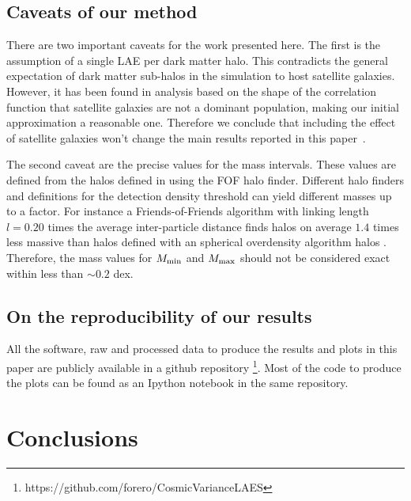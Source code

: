 \documentclass[usenatbib]{mn2e}
\newcommand{\documentname}{paper~}
\begin{document}
\subsection{Caveats of our method}

There are two important caveats for the work presented here. The first is the
assumption of a single LAE per dark matter halo. This contradicts the
general expectation of dark matter sub-halos in the simulation to host
satellite galaxies. However, it has been found in analysis based on
the shape of the correlation function \citep{Jose2013b} that satellite
galaxies are not a dominant population, making our initial
approximation a reasonable one. Therefore we conclude that including
the effect of satellite galaxies won't change the main results
reported in this \documentname.

The second caveat are the precise values for the mass intervals. These
values are defined from the halos defined in using the FOF halo
finder. Different halo finders and definitions for the detection
density threshold can yield different masses up to a factor. For
instance a Friends-of-Friends algorithm with linking length $l=0.20$
times the average inter-particle distance finds halos on average $1.4$
times less massive than halos defined  with an spherical overdensity
algorithm halos \citep{Bolshoi}. Therefore, the mass values for
$M_{\rm min}$ and $M_{\rm max}$ should not be considered exact within
less than $\sim 0.2$ dex.  



\subsection{On the reproducibility of our results}

All the software, raw and processed data to produce the results
and plots in this paper are publicly available in a github
repository \footnote{https://github.com/forero/CosmicVarianceLAES}. Most
of the code to produce the plots can be found as an Ipython notebook
\citep{IPython} in the same repository.



\section{Conclusions}
\label{sec:conclusions}
\end{document}
